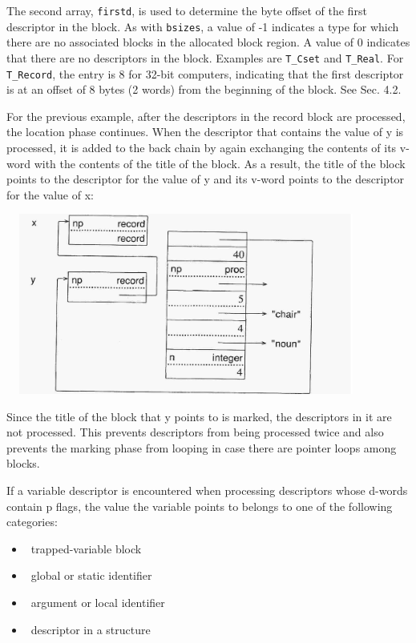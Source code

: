 The second array, \texttt{firstd}, is used to determine the byte
offset of the first descriptor in the block. As with \texttt{bsizes},
a value of -1 indicates a type for which there are no associated
blocks in the allocated block region.  A value of 0 indicates that
there are no descriptors in the block. Examples are \texttt{T\_Cset}
and \texttt{T\_Real}.  For \texttt{T\_Record}, the entry is 8 for
32-bit computers, indicating that the first descriptor is at an offset
of 8 bytes (2 words) from the beginning of the block. See Sec. 4.2.

For the previous example, after the descriptors in the record block
are processed, the location phase continues. When the descriptor that
contains the value of y is processed, it is added to the back chain by
again exchanging the contents of its v-word with the contents of the
title of the block. As a result, the title of the block points to the
descriptor for the value of y and its v-word points to the descriptor
for the value of x:

\ \  \includegraphics[width=4.3811in,height=2.3402in]{ib-img/ib-img092.jpg} 

Since the title of the block that y points to is marked, the
descriptors in it are not processed. This prevents descriptors from
being processed twice and also prevents the marking phase from looping
in case there are pointer loops among blocks.

If a variable descriptor is encountered when processing descriptors
whose d-words contain p flags, the value the variable points to
belongs to one of the following categories:

\liststyleLxiv
\begin{itemize}
\item 
\ trapped-variable block
\item 
\ global or static identifier
\item 
\ argument or local identifier
\item 
\ descriptor in a structure
\end{itemize}

